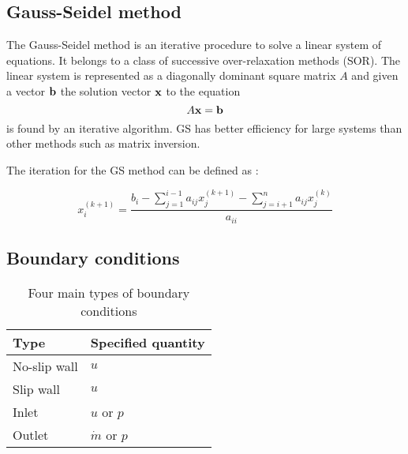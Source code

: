 \documentclass[12pt]{article}
\newcommand{\vb}[1]{\text{\textbf{#1}}}
\begin{document}
\subsection{Gauss-Seidel method}

The Gauss-Seidel method is an iterative procedure to solve a linear system of equations. It belongs to a class of successive over-relaxation methods (SOR). The linear system is represented as a diagonally dominant square matrix $A$ and given a vector $\vb b$ the solution vector $\vb x$ to the equation
$$
A \vb x = \vb b
$$
is found by an iterative algorithm. GS has better efficiency for large systems than other methods such as matrix inversion.

The iteration for the GS method can be defined as \cite[p.~510]{golub}:

\begin{equation}
  x_i^{(k + 1)} = \frac{b_i - \sum_{j=1}^{i-1} a_{ij} x_j^{(k + 1)} - \sum_{j=i+1}^{n} a_{ij} x_j^{(k)}}{a_{ii}}
\end{equation}

\subsection{Boundary conditions}

\indent

\begin{table}[H]
  \centering
  \begin{tabular}{| l | l |}
    \hline
    
    Type & Specified quantity \\
    
    \hline
    
    No-slip wall & $u$ \\

    \hline

    Slip wall & $u$ \\
    
    \hline

    Inlet & $u$ or $p$ \\
    
    \hline

    Outlet & $\dot m$ or $p$\\
    
    \hline
  \end{tabular}
  
  \caption{Four main types of boundary conditions}
\end{table}
\end{document}
